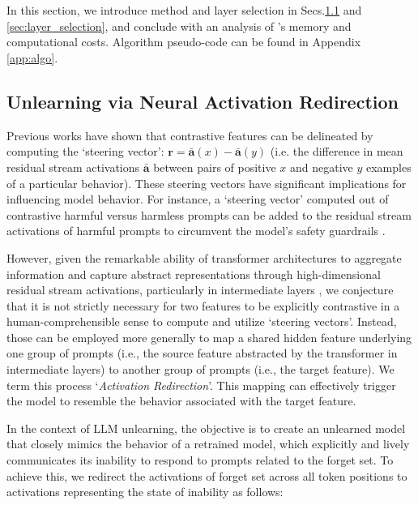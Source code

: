 \section{\lunar}\label{sec:method_training}
In this section, we introduce \lunar method and layer selection in Secs.\ref{sec:method_training} and \ref{sec:layer_selection}, and conclude with an analysis of \lunar's memory and computational costs. Algorithm pseudo-code can be found in Appendix \ref{app:algo}.

\subsection{Unlearning via Neural Activation Redirection}\label{sec:method_training}

Previous works \cite{panickssery2023steering, marks2023geometry} have shown that contrastive features can be delineated by computing the `steering vector': 
\( \mathbf{r} = \bar{\mathbf{a}}(x) - \bar{\mathbf{a}}(y)\) 
(i.e. the difference in mean residual stream activations $\bar{\mathbf{a}}$ between pairs of positive $x$ and negative $y$ examples of a particular behavior). These steering vectors have significant implications for influencing model behavior. For instance, a `steering vector' computed out of contrastive harmful versus harmless prompts can be added to the residual stream activations of harmful prompts to circumvent the model's safety guardrails \citep{single_direction}.

However, given the remarkable ability of transformer architectures to aggregate information and capture abstract representations through high-dimensional residual stream activations, particularly in intermediate layers \cite{grosse2023studying, dwivedi2020generalization}, we conjecture that it is not strictly necessary for two features to be explicitly contrastive in a human-comprehensible sense to compute and utilize `steering vectors'. Instead, those can be employed more generally to map a shared hidden feature underlying one group of prompts (i.e., the source feature abstracted by the transformer in intermediate layers) to another group of prompts (i.e., the target feature). We term this process `\emph{Activation Redirection}'. This mapping can effectively trigger the model to resemble the behavior associated with the target feature.

In the context of LLM unlearning, the objective is to create an unlearned model that closely mimics the behavior of a retrained model, which explicitly and lively communicates its inability to respond to prompts related to the forget set. To achieve this, we redirect the activations of forget set across all token positions to activations representing the state of inability as follows:

